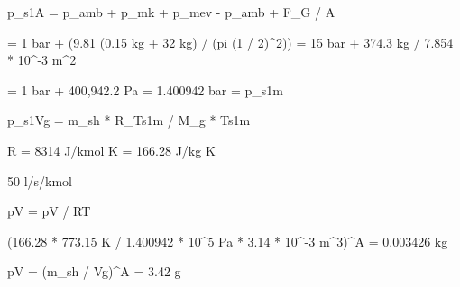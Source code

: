 p_s1A = p_amb + p_mk + p_mev - p_amb + F_G / A

= 1 bar + (9.81 (0.15 kg + 32 kg) / (pi (1 / 2)^2)) = 15 bar + 374.3 kg / 7.854 * 10^-3 m^2

= 1 bar + 400,942.2 Pa = 1.400942 bar = p_s1m

p_s1Vg = m_sh * R_Ts1m / M_g * Ts1m

R = 8314 J/kmol K = 166.28 J/kg K

50 l/s/kmol

pV = pV / RT

(166.28 * 773.15 K / 1.400942 * 10^5 Pa * 3.14 * 10^-3 m^3)^A = 0.003426 kg

pV = (m_sh / Vg)^A = 3.42 g